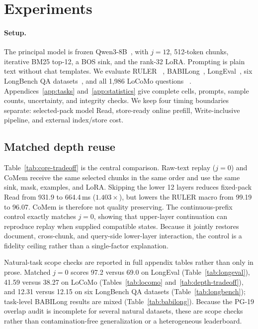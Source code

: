 \section{Experiments}
\label{sec:experiments}

\paragraph{Setup.}
The principal model is frozen Qwen3-8B~\citep{qwen3}, with $j{=}12$,
512-token chunks, iterative BM25 top-12, a BOS sink, and the rank-32 LoRA.
Prompting is plain text without chat templates. We evaluate RULER
~\citep{ruler}, BABILong~\citep{babilong}, LongEval~\citep{longchat}, six
LongBench QA datasets~\citep{longbench}, and all 1,986 LoCoMo questions
~\citep{locomo}. Appendices~\ref{app:tasks} and~\ref{app:statistics} give
complete cells, prompts, sample counts, uncertainty, and integrity checks. We keep four
timing boundaries separate: selected-pack model Read, store-ready online
prefill, Write-inclusive pipeline, and external index/store cost.

\subsection{Matched depth reuse}


Table~\ref{tab:core-tradeoff} is the central comparison. Raw-text replay
($j{=}0$) and CoMem receive the same selected chunks in the same order and use
the same sink, mask, examples, and LoRA. Skipping the lower 12 layers reduces
fixed-pack Read from 931.9 to 664.4\,ms ($1.403\times$), but lowers the RULER
macro from 99.19 to 96.07. CoMem is therefore not quality preserving. The
continuous-prefix control exactly matches $j{=}0$, showing that upper-layer
continuation can reproduce replay when supplied compatible states. Because it
jointly restores document, cross-chunk, and query-side lower-layer interaction,
the control is a fidelity ceiling rather than a single-factor explanation.

Natural-task scope checks are reported in full appendix tables rather than only
in prose. Matched $j{=}0$ scores 97.2 versus 69.0 on LongEval
(Table~\ref{tab:longeval}), 41.59 versus 38.27 on LoCoMo
(Tables~\ref{tab:locomo} and~\ref{tab:depth-tradeoff}), and 12.31 versus 12.15
on six LongBench QA datasets (Table~\ref{tab:longbench}); task-level BABILong
results are mixed (Table~\ref{tab:babilong}). Because the PG-19 overlap audit
is incomplete for several natural datasets, these are scope checks rather than
contamination-free generalization or a heterogeneous leaderboard.

